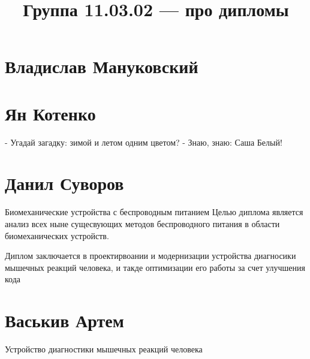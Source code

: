 \documentclass{article}
\title{Группа 11.03.02 --- про дипломы}
\begin{document}
\section*{Владислав Мануковский}

\section*{Ян Котенко}
- Угадай загадку: зимой и летом одним цветом?
- Знаю, знаю: Саша Белый!

\section*{Данил Суворов}
Биомеханические устройства с беспроводным питанием
Целью диплома является анализ всех ныне сущесвующих методов беспроводного питания в области биомеханических устройств.

Диплом заключается в проектирвоании и модернизации устройства диагносики мышечных реакций человека, и такде оптимизации его работы за счет улучшения кода
\section*{Васькив Артем}
Устройство диагностики мышечных реакций человека 
\end{document}
